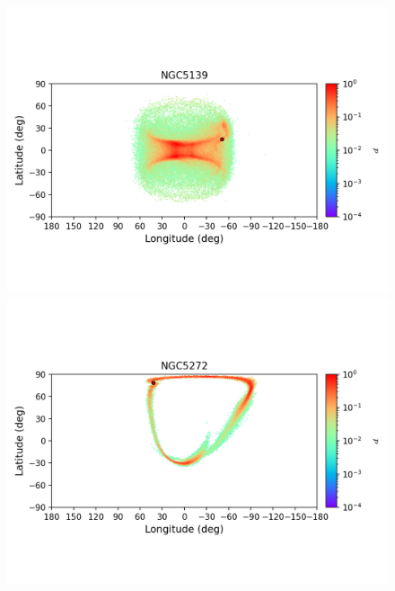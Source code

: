         \begin{figure}
            \begin{center}
                \includegraphics[clip=true, trim = 0mm 20mm 0mm 10mm, width=1\columnwidth]{images/error_plots_NGC5139.png}
                \includegraphics[clip=true, trim = 0mm 20mm 0mm 10mm, width=1\columnwidth]{images/error_plots_NGC5272.png}
                

\end{center}
\end{figure}
